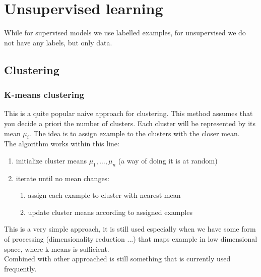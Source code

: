 \chapter{Unsupervised learning}
\label{cha:unsupervised}

While for supervised models we use labelled examples, for unsupervised we do not have any labels, but only data.

\section{Clustering}

\subsection{K-means clustering}
        This is a quite popular naive approach for clustering. This method assumes that you decide a priori the number of clusters. Each cluster will be represented by its mean $\mu_i$. The idea is to assign example to the clusters with the closer mean.\\

        The algorithm works within this line:
        \begin{enumerate}
            \item initialize cluster means $\mu_1, \dots, \mu_n$ (a way of doing it is at random)
            \item iterate until no mean changes:
            \begin{enumerate}
                \item assign each example to cluster with nearest mean
                \item update cluster means according to assigned examples
            \end{enumerate}
        \end{enumerate}

        This is a very simple approach, it is still used especially when we have some form of processing (dimensionality reduction ...) that maps example in low dimensional space, where k-means is sufficient. \\
        Combined with other approached is still something that is currently used frequently.
        

